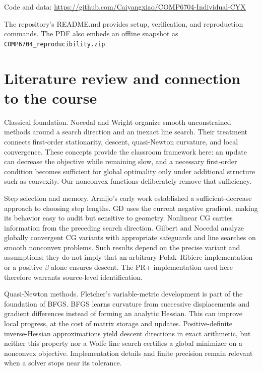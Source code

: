 \documentclass[10pt]{article}
\begin{document}
{\small\raggedright Code and data: \url{https://github.com/Caiyangxiao/COMP6704-Individual-CYX}\par}
{\small The repository's README.md provides setup, verification, and reproduction commands. The PDF also embeds an offline snapshot as \texttt{COMP6704\_reproducibility.zip}.\par}

\newpage
\setcounter{section}{1}
\section{Literature review and connection to the course}
Classical foundation. Nocedal and Wright \cite{ref1} organize smooth unconstrained methods around a search direction and an inexact line search. Their treatment connects first-order stationarity, descent, quasi-Newton curvature, and local convergence. These concepts provide the classroom framework here: an update can decrease the objective while remaining slow, and a necessary first-order condition becomes sufficient for global optimality only under additional structure such as convexity. Our nonconvex functions deliberately remove that sufficiency.

Step selection and memory. Armijo's early work \cite{ref2} established a sufficient-decrease approach to choosing step lengths. GD uses the current negative gradient, making its behavior easy to audit but sensitive to geometry. Nonlinear CG carries information from the preceding search direction. Gilbert and Nocedal \cite{ref3} analyze globally convergent CG variants with appropriate safeguards and line searches on smooth nonconvex problems. Such results depend on the precise variant and assumptions; they do not imply that an arbitrary Polak--Ribiere implementation or a positive \(\beta\) alone ensures descent. The PR+ implementation used here therefore warrants source-level identification.

Quasi-Newton methods. Fletcher's variable-metric development \cite{ref4} is part of the foundation of BFGS. BFGS learns curvature from successive displacements and gradient differences instead of forming an analytic Hessian. This can improve local progress, at the cost of matrix storage and updates. Positive-definite inverse-Hessian approximations yield descent directions in exact arithmetic, but neither this property nor a Wolfe line search certifies a global minimizer on a nonconvex objective. Implementation details and finite precision remain relevant when a solver stops near its tolerance.
\end{document}

